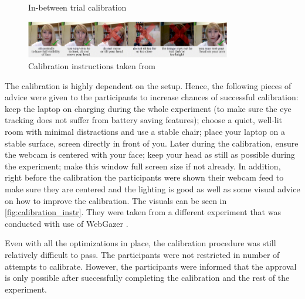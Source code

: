 \begin{figure}
    \centering
    \caption{In-between trial calibration}
    \label{fig:inbetween_calibration_webcam}
\end{figure}

\begin{figure}
    \centering
    \includegraphics[width=0.8\textwidth]{images/calibration_instr.png}
    \caption{Calibration instructions taken from \cite{Semmelmann_2018}}
    \label{fig:calibration_instr}
\end{figure}

The calibration is highly dependent on the setup. Hence, the following pieces of advice were given to the participants to increase chances of successful calibration: keep the laptop on charging during the whole experiment (to make sure the eye tracking does not suffer from battery saving features); choose a quiet, well-lit room with minimal distractions and use a stable chair; place your laptop on a stable surface, screen directly in front of you. Later during the calibration, ensure the webcam is centered with your face; keep your head as still as possible during the experiment; make this window full screen size if not already. In addition, right before the calibration the participants were shown their webcam feed to make sure they are centered and the lighting is good as well as some visual advice on how to improve the calibration. The visuals can be seen in \autoref{fig:calibration_instr}. They were taken from a different experiment \citep{Semmelmann_2018} that was conducted with use of WebGazer \citep{webgazer}.

Even with all the optimizations in place, the calibration procedure was still relatively difficult to pass. The participants were not restricted in number of attempts to calibrate. However, the participants were informed that the approval is only possible after successfully completing the calibration and the rest of the experiment.

